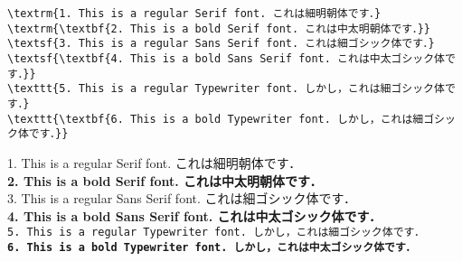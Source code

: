 \begin{tcolorbox}[title=\gtbf{命令型欧文コマンド使用例},colback=blue!5!white,colframe=blue!70!black,enhanced,breakable=true]
\begin{lstlisting}
\textrm{1. This is a regular Serif font. これは細明朝体です．}
\textrm{\textbf{2. This is a bold Serif font. これは中太明朝体です．}}
\textsf{3. This is a regular Sans Serif font. これは細ゴシック体です．}
\textsf{\textbf{4. This is a bold Sans Serif font. これは中太ゴシック体です．}}
\texttt{5. This is a regular Typewriter font. しかし，これは細ゴシック体です．}
\texttt{\textbf{6. This is a bold Typewriter font. しかし，これは細ゴシック体です．}}
\end{lstlisting}
\begin{tcolorbox}[title=\gtbf{出力},colback=yellow!15!white,colframe=blue!75!black]
\textrm{1. This is a regular Serif font. これは細明朝体です．}\\
\textrm{\textbf{2. This is a bold Serif font. これは中太明朝体です．}}\\
\textsf{3. This is a regular Sans Serif font. これは細ゴシック体です．}\\
\textsf{\textbf{4. This is a bold Sans Serif font. これは中太ゴシック体です．}}\\
\texttt{5. This is a regular Typewriter font. しかし，これは細{\color{red}ゴシック体}です．}\\
\texttt{\textbf{6. This is a bold Typewriter font. しかし，これは中太{\color{red}ゴシック体}です．}}
\end{tcolorbox}
\end{tcolorbox}

